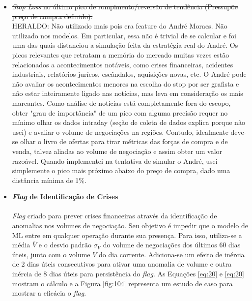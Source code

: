\begin{itemize}
    \item \sout{\textit{Stop Loss} no último pico de rompimento/reversão de tendência (Pressupõe preço de compra definido).} \\
    \color{red} HERALDO: Não utilizado mais pois era feature do André Moraes. Não utilizado nos modelos. Em particular, essa não é trivial de se calcular e foi uma das quais distanciou a simulação feita da estratégia real do André. Os picos relevantes que retratam a memória do mercado muitas vezes estão relacionados a acontecimentos notáveis, como crises financeiras, acidentes industriais, relatórios jurícos, escândalos, aquisições novas, etc. O André pode não avaliar os acontecimentos menores na escolha do stop por ser grafista e não estar inteiramente ligado nas notícias, mas leva em consideração os mais marcantes. Como análise de notícias está completamente fora do escopo, obter "grau de importância" de um pico com alguma precisão requer no mínimo olhar os dados intraday (seção de coleta de dados explica porque não usei) e avaliar o volume de negociações na regiões. Contudo, idealmente deve-se olhar o livro de ofertas para tirar métricas das forças de compra e de venda, talvez aliadas ao volume de negociação e assim obter um valor razoável. Quando implementei na tentativa de simular o André, usei simplemente o pico mais próximo abaixo do preço de compra, dado uma distância mínima de 1\%. 

    \item \textbf{\textit{Flag} de Identificação de Crises} \\ \\
        \textit{Flag} criado para prever crises financeiras através da identificação de anomalias nos volumes de negociação. Seu objetivo é impedir que o modelo de ML entre em qualquer operação durante sua presença. Para isso, utiliza-se a média \begin{math} \overline{V} \end{math} e o desvio padrão \begin{math} \sigma_V \end{math} do volume de negociações dos últimos 60 dias úteis, junto com o volume \begin{math} V \end{math} do dia corrente. Adiciona-se um efeito de inércia de 2 dias úteis consecutivos para ativar uma anomalia de volume e outra inércia de 8 dias úteis para persistência do \textit{flag}. As Equações \ref{eq:20} e \ref{eq:20} mostram o cálculo e a Figura \ref{fig:104} representa um estudo de caso para mostrar a eficácia o \textit{flag}.


\end{itemize}
